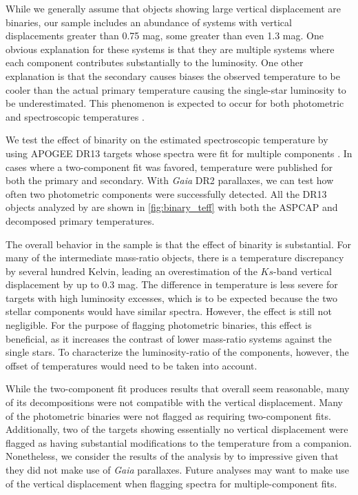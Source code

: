 \documentclass[twocolumn]{aastex6}
\newcommand{\Gaia}{\mbox{\textit{Gaia}}}
\begin{document}
While we generally assume that objects showing large vertical displacement are
binaries, our sample includes an abundance of systems with vertical
displacements greater than 0.75 mag, some greater than even 1.3 mag. One
obvious explanation for these systems is that they are multiple systems 
where each component contributes substantially to the luminosity. One other 
explanation is that the secondary causes biases the observed temperature to be 
cooler than the actual primary temperature causing the single-star luminosity 
to be underestimated. This phenomenon is expected to occur for both 
photometric and spectroscopic temperatures \citep{Pinsonneault12,ElBadry18a}. 

We test the effect of binarity on the estimated spectroscopic temperature by 
using APOGEE DR13 targets whose spectra were fit for multiple components
\citep{ElBadry18b}. In cases where a two-component fit was favored, temperature
were published for both the primary and secondary. With \Gaia{} DR2 parallaxes,
we can test how often two photometric components were successfully
detected. All the DR13 objects analyzed by \citet{ElBadry18b} are shown in
\cref{fig:binary_teff} with both the ASPCAP and decomposed primary 
temperatures.

The overall behavior in the \citet{ElBadry18b} sample is that the effect of 
binarity is substantial. For many of the intermediate mass-ratio objects, there
is a temperature discrepancy by several hundred Kelvin, leading an 
overestimation of the \(Ks\)-band vertical displacement by up to 
0.3 mag. The difference in temperature is less severe for targets with high 
luminosity excesses, which is to be expected because the two stellar 
components would have similar spectra. However, the effect is still 
not negligible. For the purpose of flagging photometric binaries, this effect
is beneficial, as it increases the contrast of lower mass-ratio systems
against the single stars. To characterize the luminosity-ratio of the 
components, however, the offset of temperatures would need to be taken into 
account. 

While the two-component fit produces results that overall seem reasonable, many
of its decompositions were not compatible with the vertical displacement. Many
of the photometric binaries were not flagged as requiring two-component fits.
Additionally, two of the targets showing essentially no vertical displacement
were flagged as having substantial modifications to the temperature from a
companion. Nonetheless, we consider the results of the analysis by 
\citet{ElBadry18b} to impressive given that they did not make use of \Gaia{} 
parallaxes. Future analyses may want to make use of the vertical displacement 
when flagging spectra for multiple-component fits.
\end{document}
